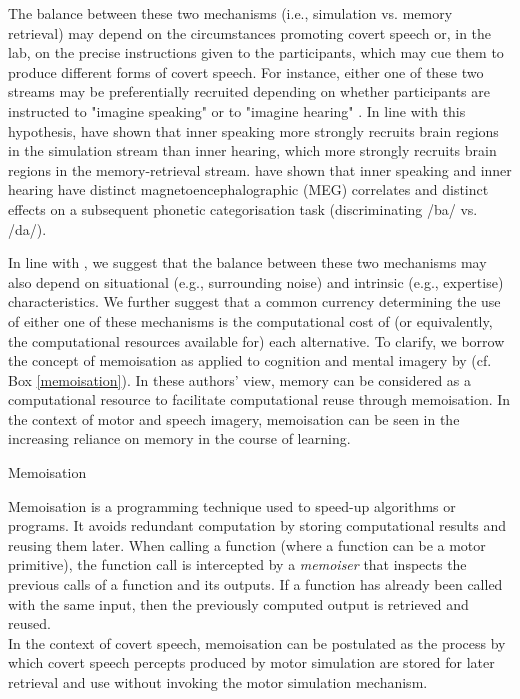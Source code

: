\documentclass[utf8]{template/frontiersSCNS} %
\begin{document}
The balance between these two mechanisms (i.e., simulation vs. memory retrieval) may depend on the circumstances promoting covert speech or, in the lab, on the precise instructions given to the participants, which may cue them to produce different forms of covert speech. For instance, either one of these two streams may be preferentially recruited depending on whether participants are instructed to "imagine speaking" or to "imagine hearing" \citep[see also the distinction between the "inner ear" and the "inner voice", e.g.,][]{smith_subvocalization_1992}. In line with this hypothesis, \cite{tian_mental_2016} have shown that inner speaking more strongly recruits brain regions in the simulation stream than inner hearing, which more strongly recruits brain regions in the memory-retrieval stream. \cite{ma_distinct_2019} have shown that inner speaking and inner hearing have distinct magnetoencephalographic (MEG) correlates and distinct effects on a subsequent phonetic categorisation task (discriminating /ba/ vs. /da/).

In line with \cite{tian_mental_2012}, we suggest that the balance between these two mechanisms may also depend on situational (e.g., surrounding noise) and intrinsic (e.g., expertise) characteristics. We further suggest that a common currency determining the use of either one of these mechanisms is the computational cost of (or equivalently, the computational resources available for) each alternative. To clarify, we borrow the concept of memoisation as applied to cognition and mental imagery by \cite{dasgupta_memory_2021} (cf. Box \ref{memoisation}). In these authors' view, memory can be considered as a computational resource to facilitate computational reuse through memoisation. In the context of motor and speech imagery, memoisation can be seen in the increasing reliance on memory in the course of learning.

\begin{mybox}[label=memoisation,float,floatplacement=!htb]{Memoisation}

Memoisation is a programming technique used to speed-up algorithms or programs. It avoids redundant computation by storing computational results and reusing them later. When calling a function (where a function can be a motor primitive), the function call is intercepted by a \textit{memoiser} that inspects the previous calls of a function and its outputs. If a function has already been called with the same input, then the previously computed output is retrieved and reused.\\

In the context of covert speech, memoisation can be postulated as the process by which covert speech percepts produced by motor simulation are stored for later retrieval and use without invoking the motor simulation mechanism. 

\end{mybox}
\end{document}
